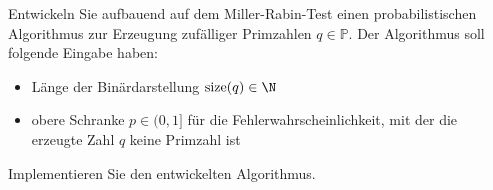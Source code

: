 \documentclass[german]{mhexsheet}
\begin{document}
 \begin{exercise}[title = Primzahlerzeugung]
Entwickeln Sie aufbauend auf dem Miller-Rabin-Test einen probabilistischen Algorithmus zur Erzeugung zufälliger Primzahlen $q \in \mathbb P$. Der Algorithmus soll folgende Eingabe haben:
 \begin{itemize}
 \item Länge der Binärdarstellung $\operatorname{size}(q) \in \N$
 \item obere Schranke $p \in (0, 1]$ für die Fehlerwahrscheinlichkeit, mit der die erzeugte Zahl $q$ keine Primzahl ist 
 \end{itemize}
 Implementieren Sie den entwickelten Algorithmus.
 \end{exercise}

 
\end{document}
